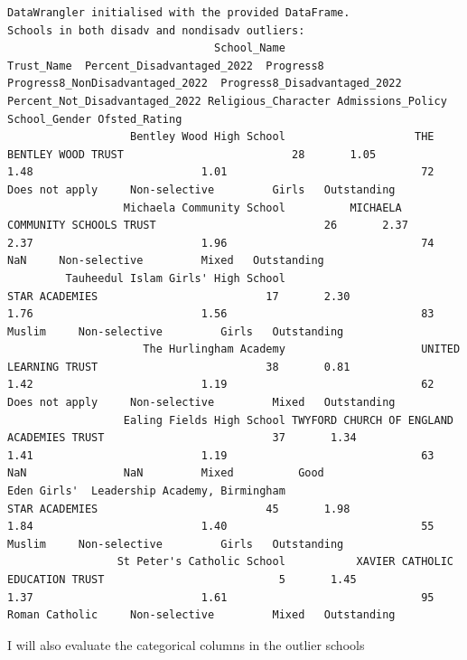 \documentclass[
  letterpaper,
  DIV=11,
  numbers=noendperiod]{scrartcl}
\begin{document}
\begin{verbatim}
DataWrangler initialised with the provided DataFrame.
Schools in both disadv and nondisadv outliers:
                                School_Name                                Trust_Name  Percent_Disadvantaged_2022  Progress8  Progress8_NonDisadvantaged_2022  Progress8_Disadvantaged_2022  Percent_Not_Disadvantaged_2022 Religious_Character Admissions_Policy School_Gender Ofsted_Rating
                   Bentley Wood High School                    THE BENTLEY WOOD TRUST                          28       1.05                             1.48                          1.01                              72      Does not apply     Non-selective         Girls   Outstanding
                  Michaela Community School          MICHAELA COMMUNITY SCHOOLS TRUST                          26       2.37                             2.37                          1.96                              74                 NaN     Non-selective         Mixed   Outstanding
         Tauheedul Islam Girls' High School                            STAR ACADEMIES                          17       2.30                             1.76                          1.56                              83              Muslim     Non-selective         Girls   Outstanding
                     The Hurlingham Academy                     UNITED LEARNING TRUST                          38       0.81                             1.42                          1.19                              62      Does not apply     Non-selective         Mixed   Outstanding
                  Ealing Fields High School TWYFORD CHURCH OF ENGLAND ACADEMIES TRUST                          37       1.34                             1.41                          1.19                              63                 NaN               NaN         Mixed          Good
Eden Girls'  Leadership Academy, Birmingham                            STAR ACADEMIES                          45       1.98                             1.84                          1.40                              55              Muslim     Non-selective         Girls   Outstanding
                 St Peter's Catholic School           XAVIER CATHOLIC EDUCATION TRUST                           5       1.45                             1.37                          1.61                              95      Roman Catholic     Non-selective         Mixed   Outstanding
\end{verbatim}

I will also evaluate the categorical columns in the outlier schools
\end{document}
